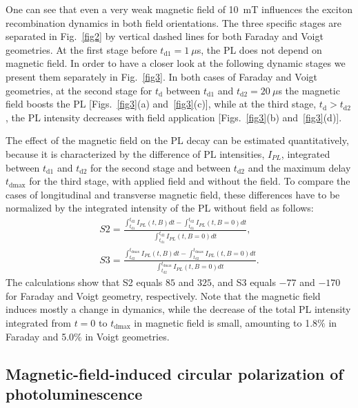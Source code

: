 \documentclass[twocolumn,showpacs,preprintnumbers,amsmath,amssymb,aps]{revtex4-1}
\begin{document}
One can see that even a very weak magnetic field of 10~mT influences
the exciton recombination dynamics in both field orientations. The
three specific stages are separated in Fig.~\ref{fig2} by vertical
dashed lines for both Faraday and Voigt geometries. At the first
stage before $t_{\text{d}1}=1~\mu$s, the PL does not depend on magnetic
field. In order to have a closer look at the following dynamic
stages we present them separately in Fig.~\ref{fig3}. In both cases
of Faraday and Voigt geometries, at the second stage for
$t_{\text{d}}$ between $t_{\text{d1}}$ and $t_{\text{d2}}=20~\mu$s
the magnetic field boosts the PL [Figs.~\ref{fig3}(a)
and~\ref{fig3}(c)], while at the third stage, $t_{\text{d}} >
t_{\text{d2}}$, the PL intensity decreases with field application
[Figs.~\ref{fig3}(b) and~\ref{fig3}(d)].

The effect of the magnetic field on the PL decay can be estimated
quantitatively, because it is characterized by the difference of PL intensities, $I_{PL}$, integrated between $t_{\text{d1}}$ and $t_{\text{d2}}$ for the second stage and between $t_{\text{d2}}$ and the maximum delay $t_{\text{dmax}}$ for the third stage, with applied field and without the field. To compare the cases of longitudinal and transverse
magnetic field, these differences have to be normalized by the
integrated intensity of the PL without field as follows:
\begin{eqnarray}
  \label{Eq1}
  S2=\frac{\int_{t_{\text{d1}}}^{t_{\text{d2}}} I_{PL}(t,B)dt - \int_{t_{\text{d1}}}^{t_{\text{d2}}} I_{PL}(t,B=0)dt}{\int_{t_{\text{d1}}}^{t_{\text{d2}}}
  I_{PL}(t,B=0)dt},\\
  S3=\frac{\int_{t_{\text{d2}}}^{t_{\text{dmax}}} I_{PL}(t,B)dt - \int_{t_{\text{d2}}}^{t_{\text{dmax}}} I_{PL}(t,B=0)dt}{\int_{t_{\text{d2}}}^{t_{\text{dmax}}} I_{PL}(t,B=0)dt}.\nonumber
\end{eqnarray}
The calculations show that S2 equals $85$ and $325$, and S3 equals
$-77$ and $-170$ for Faraday and Voigt geometry, respectively.
Note that the magnetic field induces mostly a change in dymanics, while the
decrease of the total PL intensity integrated from $t=0$ to
$t_{\text{dmax}}$ in magnetic field is small, amounting to 1.8$\%$ in
Faraday and 5.0$\%$ in Voigt geometries.

\subsection{Magnetic-field-induced circular polarization of photoluminescence}
\end{document}
